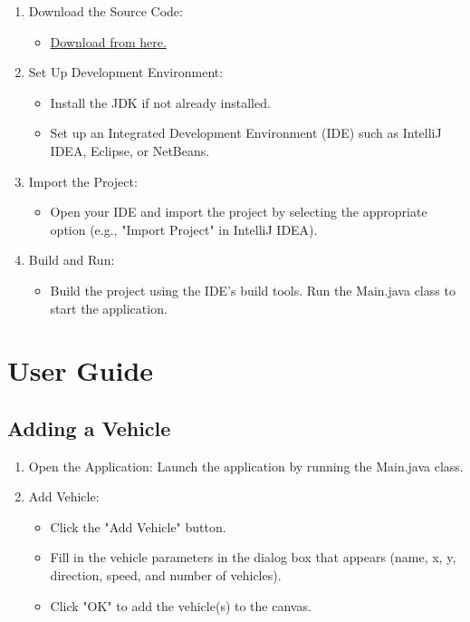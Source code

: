 \documentclass{article}
\begin{document}
\begin{enumerate}
    \item Download the Source Code: 
    \begin{itemize}
        \item \href{https://github.com/MRoland0822/Konecranes-exercise/tree/main}{Download from here.} 
    \end{itemize}
   
    \item Set Up Development Environment:
    \begin{itemize}
        \item Install the JDK if not already installed.
        \item Set up an Integrated Development Environment (IDE) such as IntelliJ IDEA, Eclipse, or NetBeans.
    \end{itemize}
    \item Import the Project:
    \begin{itemize}
        \item Open your IDE and import the project by selecting the appropriate option (e.g., "Import Project" in IntelliJ IDEA).
    \end{itemize}

    \item Build and Run:
    \begin{itemize}
        \item Build the project using the IDE's build tools.
Run the Main.java class to start the application.
    \end{itemize}

\end{enumerate}

\section{User Guide}

\subsection{Adding a Vehicle}

\begin{enumerate}
    \item Open the Application: Launch the application by running the Main.java class.
    \item Add Vehicle:
    \begin{itemize}
        \item Click the "Add Vehicle" button.
        \item Fill in the vehicle parameters in the dialog box that appears (name, x, y, direction, speed, and number of vehicles).
        \item Click "OK" to add the vehicle(s) to the canvas.
    \end{itemize}
\end{enumerate}
\end{document}
